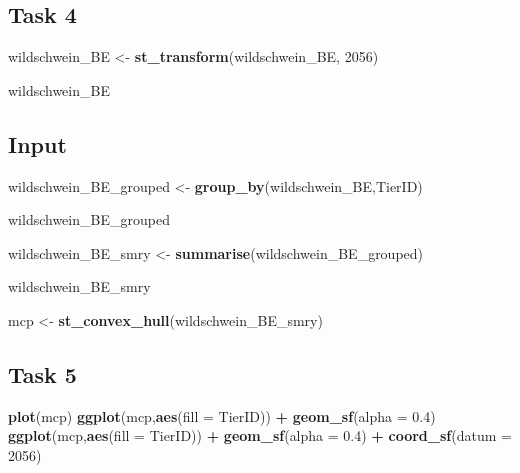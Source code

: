 \documentclass[]{book}
\newenvironment{Shaded}{\begin{snugshade}}{\end{snugshade}}
\newcommand{\KeywordTok}[1]{\textcolor[rgb]{0.13,0.29,0.53}{\textbf{#1}}}
\newcommand{\DataTypeTok}[1]{\textcolor[rgb]{0.13,0.29,0.53}{#1}}
\newcommand{\DecValTok}[1]{\textcolor[rgb]{0.00,0.00,0.81}{#1}}
\newcommand{\FloatTok}[1]{\textcolor[rgb]{0.00,0.00,0.81}{#1}}
\newcommand{\StringTok}[1]{\textcolor[rgb]{0.31,0.60,0.02}{#1}}
\newcommand{\OperatorTok}[1]{\textcolor[rgb]{0.81,0.36,0.00}{\textbf{#1}}}
\newcommand{\NormalTok}[1]{#1}
\begin{document}
\subsection{Task 4}\label{task-4}

\begin{Shaded}
\begin{Highlighting}[]

\NormalTok{wildschwein_BE <-}\StringTok{ }\KeywordTok{st_transform}\NormalTok{(wildschwein_BE, }\DecValTok{2056}\NormalTok{)}


\NormalTok{wildschwein_BE}
\end{Highlighting}
\end{Shaded}

\subsection{Input}\label{input-1}

\begin{Shaded}
\begin{Highlighting}[]
\NormalTok{wildschwein_BE_grouped <-}\StringTok{ }\KeywordTok{group_by}\NormalTok{(wildschwein_BE,TierID)}

\NormalTok{wildschwein_BE_grouped}

\NormalTok{wildschwein_BE_smry <-}\StringTok{ }\KeywordTok{summarise}\NormalTok{(wildschwein_BE_grouped)}

\NormalTok{wildschwein_BE_smry}

\NormalTok{mcp <-}\StringTok{ }\KeywordTok{st_convex_hull}\NormalTok{(wildschwein_BE_smry)}
\end{Highlighting}
\end{Shaded}

\subsection{Task 5}\label{task-5}

\begin{Shaded}
\begin{Highlighting}[]
\KeywordTok{plot}\NormalTok{(mcp)}
\KeywordTok{ggplot}\NormalTok{(mcp,}\KeywordTok{aes}\NormalTok{(}\DataTypeTok{fill =}\NormalTok{ TierID)) }\OperatorTok{+}
\StringTok{  }\KeywordTok{geom_sf}\NormalTok{(}\DataTypeTok{alpha =} \FloatTok{0.4}\NormalTok{)}
\KeywordTok{ggplot}\NormalTok{(mcp,}\KeywordTok{aes}\NormalTok{(}\DataTypeTok{fill =}\NormalTok{ TierID)) }\OperatorTok{+}
\StringTok{  }\KeywordTok{geom_sf}\NormalTok{(}\DataTypeTok{alpha =} \FloatTok{0.4}\NormalTok{) }\OperatorTok{+}
\StringTok{  }\KeywordTok{coord_sf}\NormalTok{(}\DataTypeTok{datum =} \DecValTok{2056}\NormalTok{)}
\end{Highlighting}
\end{Shaded}
\end{document}
